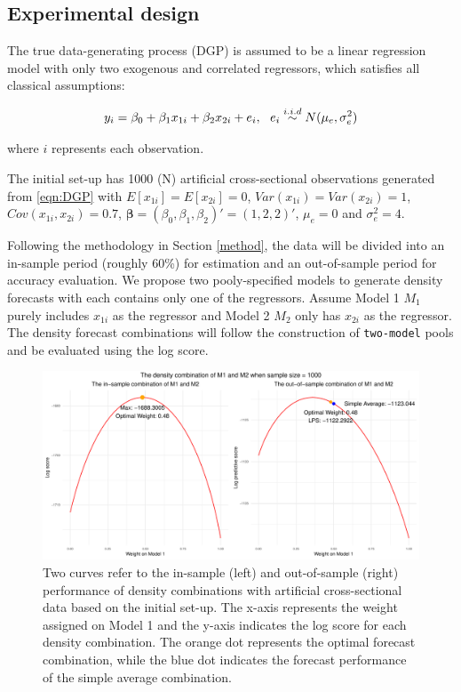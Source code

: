 \documentclass{monashthesis}
\begin{document}
\hypertarget{experimental-design}{%
\subsection{Experimental design}\label{experimental-design}}

The true data-generating process (DGP) is assumed to be a linear regression model with only two exogenous and correlated regressors, which satisfies all classical assumptions:

\begin{equation}
\label{eqn:DGP}
y_i = \beta_0 + \beta_1 x_{1i} + \beta_2 x_{2i} + e_i, \ \ e_i \stackrel{i.i.d}{\sim} N(\mu_e,\sigma^2_e) \\
\end{equation}

where \(i\) represents each observation.

The initial set-up has 1000 (N) artificial cross-sectional observations generated from \ref{eqn:DGP} with \(E[x_{1i}] = E[x_{2i}] = 0\), \(Var(x_{1i}) = Var(x_{2i}) = 1\), \(Cov(x_{1i}, x_{2i}) = 0.7\), \(\pmb{\beta} = (\beta_0, \beta_1, \beta_2)' = (1,2,2)'\), \(\mu_e = 0\) and \(\sigma^2_e=4\).

Following the methodology in Section \ref{method}, the data will be divided into an in-sample period (roughly 60\%) for estimation and an out-of-sample period for accuracy evaluation. We propose two pooly-specified models to generate density forecasts with each contains only one of the regressors. Assume Model 1 \(M_1\) purely includes \(x_{1i}\) as the regressor and Model 2 \(M_2\) only has \(x_{2i}\) as the regressor. The density forecast combinations will follow the construction of \texttt{two-model} pools and be evaluated using the log score.

\begin{figure}[ht]
\centering
\includegraphics[scale=0.6]{figures/ss_1000.pdf}
\caption{Two curves refer to the in-sample (left) and out-of-sample (right) performance of density combinations with artificial cross-sectional data based on the initial set-up. The x-axis represents the weight assigned on Model 1 and the y-axis indicates the log score for each density combination. The orange dot represents the optimal forecast combination, while the blue dot indicates the forecast performance of the simple average combination.}
\label{fig:ss1000}
\end{figure}
\end{document}

